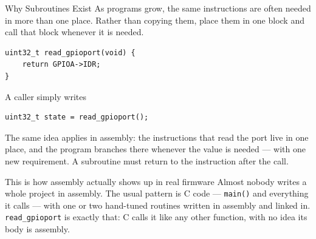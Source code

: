 \documentclass[9pt,aspectratio=169,xcolor=table]{beamer}
\begin{document}
\begin{frame}[fragile]{Why Subroutines Exist}
	\leavevmode
	{\small As programs grow, the same instructions are often needed in more
	than one place. Rather than copying them, place them in one block and
	\alert{call} that block whenever it is needed.}

	\vspace{3mm}
	\begin{lstlisting}[style=myc]
uint32_t read_gpioport(void) {
    return GPIOA->IDR;
}
	\end{lstlisting}

	\vspace{2mm}
	{\small A caller simply writes}
	\begin{lstlisting}[style=myc]
uint32_t state = read_gpioport();
	\end{lstlisting}

	\vspace{2mm}
	{\small The same idea applies in assembly: the instructions that read the
	port live in one place, and the program branches there whenever the
	value is needed --- with one new requirement. A subroutine must
	\alert{return to the instruction after the call}.}

	\vspace{2mm}
	\begin{block}{This is how assembly actually shows up in real firmware}
		Almost nobody writes a whole project in assembly. The usual pattern
		is \alert{C code --- \texttt{main()} and everything it calls ---
		with one or two hand-tuned routines written in assembly and linked
		in}. \texttt{read\_gpioport} is exactly that: C calls it like any
		other function, with no idea its body is assembly.
	\end{block}
\end{frame}
\end{document}
